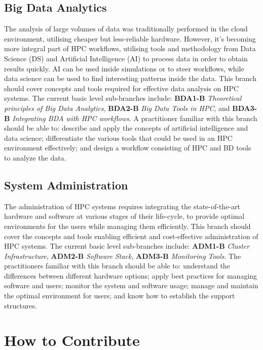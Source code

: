 \documentclass[jocse]{jocseart}
\begin{document}
\subsection{Big Data Analytics}

The analysis of large volumes of data was traditionally performed in the cloud environment, utilising cheaper but less-reliable hardware. However, it's becoming more integral part of HPC workflows, utilising tools and methodology from Data Science (DS) and Artificial Intelligence (AI) to process data in order to obtain results quickly. AI can be used inside simulations or to steer workflows, while data science can be used to find interesting patterns inside the data. This branch should cover concepts and tools required for effective data analysis on HPC systems. The current basic level sub-branches include: \textbf{BDA1-B} \textit{Theoretical principles of Big Data Analytics}, \textbf{BDA2-B} \textit{Big Data Tools in HPC}, and \textbf{BDA3-B} \textit{Integrating BDA with HPC workflows}. A practitioner familiar with this branch should be able to: describe and apply the concepts of artificial intelligence and data science; differentiate the various tools that could be used in an HPC environment effectively; and design a workflow consisting of HPC and BD tools to analyze the data.

\subsection{System Administration}

The administration of HPC systems requires integrating the state-of-the-art hardware and software at various stages of their life-cycle, to provide optimal environments for the users while managing them efficiently. This branch should cover the concepts and tools enabling efficient and cost-effective administration of HPC systems. The current basic level sub-branches include: \textbf{ADM1-B} \textit{Cluster Infrastructure}, \textbf{ADM2-B} \textit{Software Stack}, \textbf{ADM3-B} \textit{Monitoring Tools}. The practitioners familiar with this branch should be able to: understand the differences between different hardware options; apply best practices for managing software and users; monitor the system and software usage; manage and maintain the optimal environment for users; and know how to establish the support structures. 


\section{How to Contribute}
\end{document}
